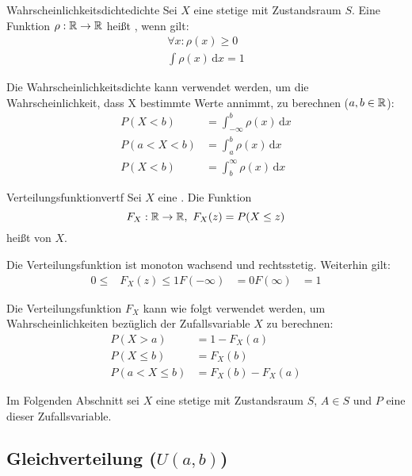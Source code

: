 \begin{definition}{Wahrscheinlichkeitsdichte}{dichte}
Sei $X$ eine stetige  mit Zustandsraum $S$.
Eine Funktion $\rho: \mathbb{R} \rightarrow \mathbb{R}$ heißt ,
wenn gilt:
\begin{align*}
  \forall x: \rho(x) \ge 0 \\
  \int \rho(x) \,\mathrm{d}x = 1
\end{align*}
\end{definition}

Die Wahrscheinlichkeitsdichte kann verwendet werden, um die Wahrscheinlichkeit,
dass X bestimmte Werte annimmt, zu berechnen ($a,b\in\mathbb{R}$):
\begin{align*}
  P(X < b) &= \int_{-\infty}^{b}\rho(x)\,\mathrm{d}x\\
  P(a<X<b) &= \int_{a}^{b}\rho(x)\,\mathrm{d}x\\
  P(X < b) &= \int^{\infty}_{b}\rho(x)\,\mathrm{d}x
\end{align*}

\begin{definition}{Verteilungsfunktion}{vertf}
Sei $X$ eine . Die Funktion
\[F_X:\mathbb{R}\to\mathbb{R},\ F_X(z) = P(X \le z)\]
heißt  von $X$.
\end{definition}

Die Verteilungsfunktion ist monoton wachsend und rechtsstetig. Weiterhin gilt:
\begin{align*}
0\le &F_X(z)\le 1
F(-\infty) &= 0
F(\infty) &= 1
\end{align*}

Die Verteilungsfunktion $F_X$ kann wie folgt verwendet werden, um
Wahrscheinlichkeiten bezüglich der Zufallsvariable $X$ zu berechnen:
\begin{align*}
P(X>a) &= 1 - F_X(a) \\
P(X\le b) &= F_X(b) \\
P(a < X \le b) &= F_X(b) - F_X(a)
\end{align*}

Im Folgenden Abschnitt sei $X$ eine stetige 
mit Zustandsraum $S$, $A \in S$ und $P$ eine
 dieser Zufallsvariable.


\subsection{Gleichverteilung ($U(a,b)$)}

